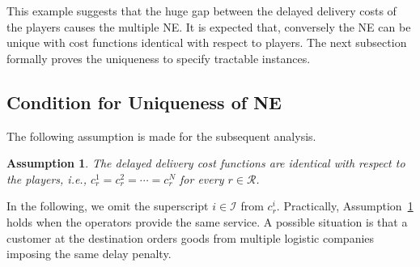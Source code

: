 \documentclass[letterpaper, 10 pt, conference]{ieeeconf}  %
\newcommand{\mc}[1]{\mathcal{#1}}
\newtheorem{assum}{Assumption}
\begin{document}
This example suggests that the huge gap between the delayed delivery costs of the players causes the multiple NE.
It is expected that, conversely the NE can be unique with cost functions identical with respect to players.
The next subsection formally proves the uniqueness to specify tractable instances.

\subsection{Condition for Uniqueness of NE}



The following assumption is made for the subsequent analysis.
\begin{assum}\label{assum:identical_intervals}
The delayed delivery cost functions are identical with respect to the players, i.e.,
$c^1_r = c^2_r = \cdots = c^N_r$ for every $r\in\mc{R}$.
\end{assum}

In the following, we omit the superscript $i\in\mc{I}$ from $c^i_r$.
Practically, Assumption~\ref{assum:identical_intervals} holds when the operators provide the same service.
A possible situation is that a customer at the destination orders goods from multiple logistic companies imposing the same delay penalty.
\end{document}
